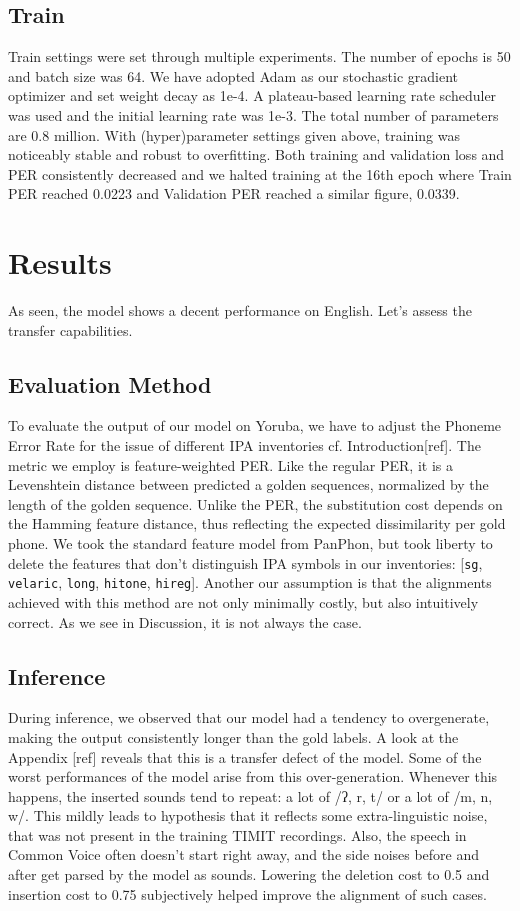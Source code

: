 \documentclass[11pt]{article}
\newcommand{\ipa}[1]{{\ipafont #1}}
\begin{document}
{\subsection{Train}
Train settings were set through multiple experiments. The number of epochs is 50 and batch size was 64. We have adopted Adam as our stochastic gradient optimizer and set weight decay as 1e-4. A plateau-based learning rate scheduler was used and the initial learning rate was 1e-3. The total number of parameters are 0.8 million. With (hyper)parameter settings given above, training was noticeably stable and robust to overfitting. Both training and validation loss and PER consistently decreased and we halted training at the 16th epoch where Train PER reached 0.0223 and Validation PER reached a similar figure, 0.0339.

\section{Results}

As seen, the model shows a decent performance on English. Let's assess the transfer capabilities.

\subsection{Evaluation Method} To evaluate the output of our model on Yoruba, we have to adjust the Phoneme Error Rate for the issue of different IPA inventories cf. Introduction[ref]. The metric we employ is feature-weighted PER. Like the regular PER, it is a Levenshtein distance between predicted a golden sequences, normalized by the length of the golden sequence. Unlike the PER, the substitution cost depends on the Hamming feature distance, thus reflecting the expected dissimilarity per gold phone. We took the standard feature model from PanPhon, but took liberty to delete the features that don't distinguish IPA symbols in our inventories: [\texttt{sg}, \texttt{velaric}, \texttt{long}, \texttt{hitone}, \texttt{hireg}].  Another our assumption is that the alignments achieved with this method are not only minimally costly, but also intuitively correct. As we see in Discussion, it is not always the case.

\subsection{Inference}

During inference, we observed that our model had a tendency to overgenerate, making the output consistently longer than the gold labels. A look at the Appendix [ref] reveals that this is a transfer defect of the model. Some of the worst performances of the model arise from this over-generation. Whenever this happens, the inserted sounds tend to repeat: a lot of \ipa{/ʔ, r, t/} or a lot of \ipa{/m, n, w/}. This mildly leads to hypothesis that it reflects some extra-linguistic noise, that was not present in the training TIMIT recordings. Also, the speech in Common Voice often doesn't start right away, and the side noises before and after get parsed by the model as sounds. Lowering the deletion cost to 0.5 and insertion cost to 0.75 subjectively helped improve the alignment of such cases.

}
\end{document}
